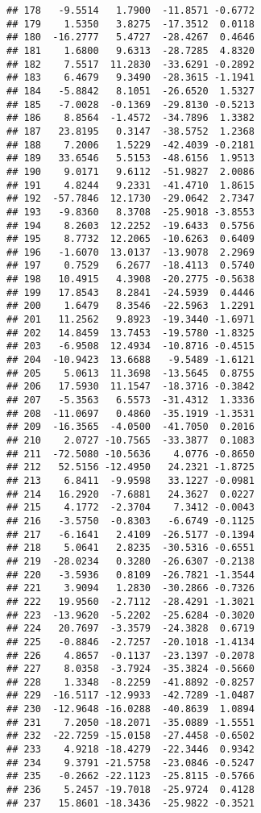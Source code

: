 \documentclass[
]{article}
\begin{document}
\begin{verbatim}
## 178   -9.5514   1.7900  -11.8571 -0.6772
## 179    1.5350   3.8275  -17.3512  0.0118
## 180  -16.2777   5.4727  -28.4267  0.4646
## 181    1.6800   9.6313  -28.7285  4.8320
## 182    7.5517  11.2830  -33.6291 -0.2892
## 183    6.4679   9.3490  -28.3615 -1.1941
## 184   -5.8842   8.1051  -26.6520  1.5327
## 185   -7.0028  -0.1369  -29.8130 -0.5213
## 186    8.8564  -1.4572  -34.7896  1.3382
## 187   23.8195   0.3147  -38.5752  1.2368
## 188    7.2006   1.5229  -42.4039 -0.2181
## 189   33.6546   5.5153  -48.6156  1.9513
## 190    9.0171   9.6112  -51.9827  2.0086
## 191    4.8244   9.2331  -41.4710  1.8615
## 192  -57.7846  12.1730  -29.0642  2.7347
## 193   -9.8360   8.3708  -25.9018 -3.8553
## 194    8.2603  12.2252  -19.6433  0.5756
## 195    8.7732  12.2065  -10.6263  0.6409
## 196   -1.6070  13.0137  -13.9078  2.2969
## 197    0.7529   6.2677  -18.4113  0.5740
## 198   10.4915   4.3908  -20.2775 -0.5638
## 199   17.8543   8.2841  -24.5939  0.4446
## 200    1.6479   8.3546  -22.5963  1.2291
## 201   11.2562   9.8923  -19.3440 -1.6971
## 202   14.8459  13.7453  -19.5780 -1.8325
## 203   -6.9508  12.4934  -10.8716 -0.4515
## 204  -10.9423  13.6688   -9.5489 -1.6121
## 205    5.0613  11.3698  -13.5645  0.8755
## 206   17.5930  11.1547  -18.3716 -0.3842
## 207   -5.3563   6.5573  -31.4312  1.3336
## 208  -11.0697   0.4860  -35.1919 -1.3531
## 209  -16.3565  -4.0500  -41.7050  0.2016
## 210    2.0727 -10.7565  -33.3877  0.1083
## 211  -72.5080 -10.5636    4.0776 -0.8650
## 212   52.5156 -12.4950   24.2321 -1.8725
## 213    6.8411  -9.9598   33.1227 -0.0981
## 214   16.2920  -7.6881   24.3627  0.0227
## 215    4.1772  -2.3704    7.3412 -0.0043
## 216   -3.5750  -0.8303   -6.6749 -0.1125
## 217   -6.1641   2.4109  -26.5177 -0.1394
## 218    5.0641   2.8235  -30.5316 -0.6551
## 219  -28.0234   0.3280  -26.6307 -0.2138
## 220   -3.5936   0.8109  -26.7821 -1.3544
## 221    3.9094   1.2830  -30.2866 -0.7326
## 222   19.9560  -2.7112  -28.4291 -1.3021
## 223  -13.9620  -5.2202  -25.6284 -0.3020
## 224   20.7697  -3.3579  -24.3828  0.6719
## 225   -0.8846  -2.7257  -20.1018 -1.4134
## 226    4.8657  -0.1137  -23.1397 -0.2078
## 227    8.0358  -3.7924  -35.3824 -0.5660
## 228    1.3348  -8.2259  -41.8892 -0.8257
## 229  -16.5117 -12.9933  -42.7289 -1.0487
## 230  -12.9648 -16.0288  -40.8639  1.0894
## 231    7.2050 -18.2071  -35.0889 -1.5551
## 232  -22.7259 -15.0158  -27.4458 -0.6502
## 233    4.9218 -18.4279  -22.3446  0.9342
## 234    9.3791 -21.5758  -23.0846 -0.5247
## 235   -0.2662 -22.1123  -25.8115 -0.5766
## 236    5.2457 -19.7018  -25.9724  0.4128
## 237   15.8601 -18.3436  -25.9822 -0.3521

\end{verbatim}
\end{document}
